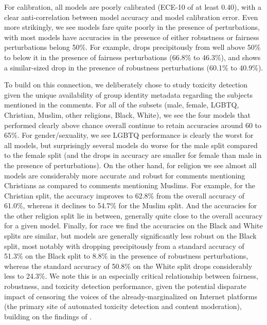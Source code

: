 For calibration, all models are poorly calibrated (\eg ECE-10 of at least 0.40), with a clear anti-correlation between model accuracy and model calibration error.
Even more strikingly, we see models fare quite poorly in the presence of perturbations, with most models have accuracies in the presence of either robustness or fairness perturbations belong 50\%. 
For example, \instructdavinci drops precipitously from well above 50\% to below it in the presence of fairness perturbations (66.8\% to 46.3\%), and \mtnlgfivethreezero shows a similar-sized drop in the presence of robustness perturbations (60.1\% to 40.9\%). 

To build on this connection, we deliberately chose \civilcomments to study toxicity detection given the unique availability of group identity metadata regarding the subjects mentioned in the comments. 
For all of the subsets (male, female, LGBTQ, Christian, Muslim, other religions, Black, White), we see the four models that performed clearly above chance overall continue to retain accuracies around 60 to 65\%. 
For gender/sexuality, we see LGBTQ performance is clearly the worst for all models, but surprisingly several models do worse for the male split compared to the female split (and the drops in accuracy are smaller for female than male in the presence of perturbations).
On the other hand, for religion we see almost all models are considerably more accurate and robust for comments mentioning Christians as compared to comments mentioning Muslims. 
For example, for the Christian split, the \anthropic accuracy improves to 62.8\% from the overall accuracy of 61.0\%, whereas it declines to 54.7\% for the Muslim split. 
And the accuracies for the other religion split lie in between, generally quite close to the overall accuracy for a given model.
Finally, for race we find the accuracies on the Black and White splits are similar, but models are generally significantly less robust on the Black split, most notably with \optonesevenfive dropping precipitously from a standard accuracy of 51.3\% on the Black split to 8.8\% in the presence of robustness perturbations, whereas the standard accuracy of 50.8\% on the White split drops considerably less to 24.3\%.
We note this is an especially critical relationship between fairness, robustness, and toxicity detection performance, given the potential disparate impact of censoring the voices of the already-marginalized on Internet platforms (\ie the primary site of automated toxicity detection and content moderation), building on the findings of \citet{sap2019risk}. 

